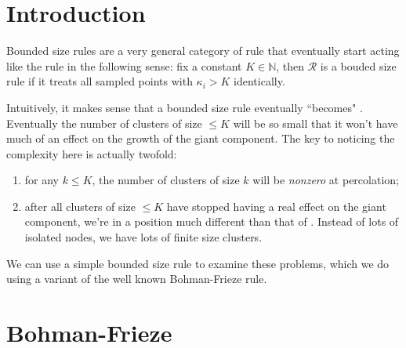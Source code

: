 \documentclass[twoside,10pt]{article}
\newcommand{\BF}{Bohman-Frieze\xspace}
\begin{document}

\section{Introduction}

Bounded size rules are a very general category of rule that eventually start acting like the \ER rule in the following sense: fix a constant $K \in \mathbb{N}$, then $\mathcal{R}$ is a bouded size rule if it treats all sampled points with $\kappa_i > K$ identically.


Intuitively, it makes sense that a bounded size rule eventually ``becomes" \ER. Eventually the number of clusters of size $\leq K$ will be so small that it won't have much of an effect on the growth of the giant component. The key to noticing the complexity here is actually twofold:
\begin{enumerate}
	\item for any $k \leq K$, the number of clusters of size $k$ will be \textit{nonzero} at percolation; 
	\item after all clusters of size $\leq K$ have stopped having a real effect on the giant component, we're in a position much different than that of \ER. Instead of lots of isolated nodes, we have lots of finite size clusters.
\end{enumerate}

We can use a simple bounded size rule to examine these problems, which we do using a variant of the well known \BF rule.

\section{Bohman-Frieze}
\end{document}
